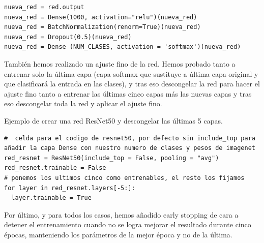 \begin{lstlisting}
nueva_red = red.output
nueva_red = Dense(1000, activation="relu")(nueva_red)
nueva_red = BatchNormalization(renorm=True)(nueva_red)
nueva_red = Dropout(0.5)(nueva_red)
nueva_red = Dense (NUM_CLASES, activation = 'softmax')(nueva_red)
\end{lstlisting}

También hemos realizado un ajuste fino de la red. Hemos probado tanto a entrenar solo la última capa (capa softmax que sustituye a última capa original y que clasificará la entrada en las clases), y tras eso descongelar la red para hacer el ajuste fino tanto a entrenar las últimas cinco capas más las nuevas capas y tras eso descongelar toda la red y aplicar el ajuste fino.

Ejemplo de crear una red ResNet50 y descongelar las últimas 5 capas.

\begin{lstlisting}
#  celda para el codigo de resnet50, por defecto sin include_top para añadir la capa Dense con nuestro numero de clases y pesos de imagenet
red_resnet = ResNet50(include_top = False, pooling = "avg")
red_resnet.trainable = False
# ponemos los ultimos cinco como entrenables, el resto los fijamos
for layer in red_resnet.layers[-5:]:
  layer.trainable = True
\end{lstlisting}

Por último, y para todos los casos, hemos añadido early stopping de cara a detener el entrenamiento cuando no se logra mejorar el resultado durante cinco épocas, manteniendo los parámetros de la mejor época y no de la última.
